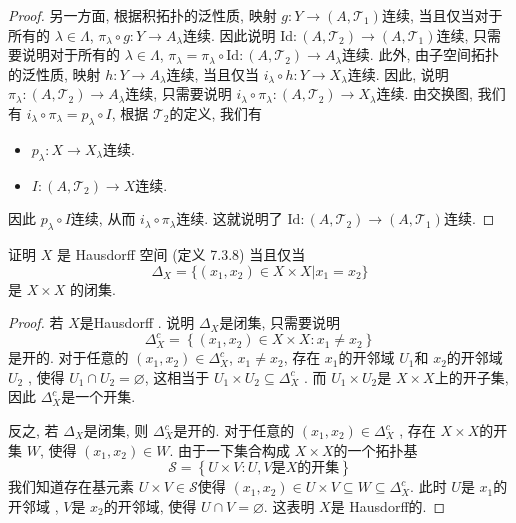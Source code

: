 \documentclass[../main.tex]{subfiles}
\begin{document}
\begin{proof}
另一方面, 根据积拓扑的泛性质, 映射 \(  g:Y\to \left( A,\mathcal{T}_{1} \right)   \)连续, 当且仅当对于所有的 \(   \lambda \in  \Lambda   \), \(   \pi_{ \lambda }\circ g:Y\to A_{ \lambda }  \)连续.  因此说明 \(  \mathrm{Id}:\left( A,\mathcal{T}_{2} \right)\to \left( A,\mathcal{T}_{1} \right)    \)连续, 只需要说明对于所有的 \(   \lambda \in  \Lambda   \), \(  \pi_{ \lambda }=   \pi_{ \lambda }\circ \mathrm{Id}:\left( A,\mathcal{T}_{2} \right)\to A_{ \lambda }   \)连续. 此外, 由子空间拓扑的泛性质, 映射 \(  h:Y\to A_{ \lambda }  \)连续, 当且仅当 \(  i_{ \lambda }\circ h:Y\to X_{ \lambda }  \)连续. 因此, 说明 \(   \pi_{\lambda }:\left( A,\mathcal{T}_{2} \right)\to A_{ \lambda }   \)连续, 只需要说明 \(  i_{ \lambda }\circ  \pi_{ \lambda }:\left( A,\mathcal{T}_{2} \right)\to X_{ \lambda }   \)连续.         由交换图, 我们有 \(  i_{ \lambda }\circ  \pi_{ \lambda }= p_{ \lambda }\circ I  \), 根据 \(  \mathcal{T}_{2}  \)的定义, 我们有 
\begin{itemize}
    \item \(  p_{ \lambda }: X\to X_{ \lambda }  \)连续.
    \item \(  I: \left( A,\mathcal{T}_{2} \right) \to X  \)连续.  
\end{itemize}
因此 \(  p_{\lambda }\circ I  \)连续, 从而 \(  i_{ \lambda }\circ  \pi_{ \lambda }  \)连续. 这就说明了 \(  \mathrm{Id}: \left( A,\mathcal{T}_{2} \right)\to \left( A,\mathcal{T}_{1} \right)    \)连续.   
\end{proof}

\begin{exercise}{}{}
证明 $X$ 是 Hausdorff 空间 (定义 7.3.8) 当且仅当
\[
\Delta_X = \{(x_1, x_2) \in X \times X | x_1 = x_2\}
\]
是 $X \times X$ 的闭集.
\end{exercise}

\begin{proof}
    若 \(  X  \)是Hausdorff  . 说明 \(   \Delta _{X}  \)是闭集, 只需要说明 \[
     \Delta _{X}^{c}= \left\{ \left( x_1,x_2 \right)\in X\times X:x_1\neq x_2  \right\}
    \]        是开的. 对于任意的 \( \left( x_1,x_2 \right)\in  \Delta _{X}^{c} \), \(  x_1\neq x_2  \),   存在 \(  x_1  \)的开邻域 \(  U_1  \)和 \(  x_2  \)的开邻域 \(  U_2  \) , 使得 \(  U_1\cap U_2= \varnothing  \), 这相当于 \(  U_1\times U_2\subseteq  \Delta _{X}^{c}  \) . 而 \(  U_1\times U_2  \)是 \(  X\times X  \)上的开子集,    因此 \(   \Delta _{X}^{c}  \)是一个开集.
    
    反之, 若 \(   \Delta _{X}  \)是闭集, 则 \(   \Delta _{X}^{c}  \)是开的. 对于任意的 \(  \left( x_1,x_2 \right)\in  \Delta _{X}^{c}   \)   , 存在 \(  X\times X  \)的开集 \(  W  \), 使得 \(  \left( x_1,x_2 \right)\in W   \). 由于一下集合构成 \(  X\times X  \)的一个拓扑基  \[
    \mathcal{S}= \left\{ U\times V: U,V\text{是}X \text{的开集} \right\}
    \]   我们知道存在基元素 \(  U\times V  \in \mathcal{S}\)使得 \(  \left( x_1,x_2 \right)\in U\times V\subseteq W \subseteq  \Delta _{X}^{c}  \). 此时 \(  U  \)是 \(  x_1  \)的开邻域 , \(  V  \)是 \(  x_2  \)的开邻域, 使得 \(  U\cap V= \varnothing  \).       这表明 \(  X  \)是 Hausdorff的.  
\end{proof}
\end{document}
